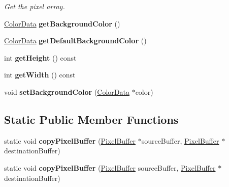 \begin{DoxyCompactItemize}
\begin{DoxyCompactList}\small\item\em Get the pixel array. \end{DoxyCompactList}\item 
\hypertarget{classPixelBuffer_a7eadc0d458fec5d0e0f502d279b86ea7}{\hyperlink{classColorData}{Color\-Data} {\bfseries get\-Background\-Color} ()}\label{classPixelBuffer_a7eadc0d458fec5d0e0f502d279b86ea7}

\item 
\hypertarget{classPixelBuffer_a36649accdea429915280ba71a7976300}{\hyperlink{classColorData}{Color\-Data} {\bfseries get\-Default\-Background\-Color} ()}\label{classPixelBuffer_a36649accdea429915280ba71a7976300}

\item 
\hypertarget{classPixelBuffer_abd5685a6a23041ed9640da9370eb7839}{int {\bfseries get\-Height} () const }\label{classPixelBuffer_abd5685a6a23041ed9640da9370eb7839}

\item 
\hypertarget{classPixelBuffer_a26dc9286596d27cd416d34611c00602e}{int {\bfseries get\-Width} () const }\label{classPixelBuffer_a26dc9286596d27cd416d34611c00602e}

\item 
\hypertarget{classPixelBuffer_a1838bd976c9c98a79b0c2eb1246b816f}{void {\bfseries set\-Background\-Color} (\hyperlink{classColorData}{Color\-Data} $\ast$color)}\label{classPixelBuffer_a1838bd976c9c98a79b0c2eb1246b816f}

\end{DoxyCompactItemize}
\subsection*{Static Public Member Functions}
\begin{DoxyCompactItemize}
\item 
\hypertarget{classPixelBuffer_afedcf4028903278e8eacbd78d11232ee}{static void {\bfseries copy\-Pixel\-Buffer} (\hyperlink{classPixelBuffer}{Pixel\-Buffer} $\ast$source\-Buffer, \hyperlink{classPixelBuffer}{Pixel\-Buffer} $\ast$destination\-Buffer)}\label{classPixelBuffer_afedcf4028903278e8eacbd78d11232ee}

\item 
\hypertarget{classPixelBuffer_a91bfa4c461b467c0504601a7bc6e29b2}{static void {\bfseries copy\-Pixel\-Buffer} (\hyperlink{classPixelBuffer}{Pixel\-Buffer} source\-Buffer, \hyperlink{classPixelBuffer}{Pixel\-Buffer} $\ast$destination\-Buffer)}\label{classPixelBuffer_a91bfa4c461b467c0504601a7bc6e29b2}

\end{DoxyCompactItemize}
